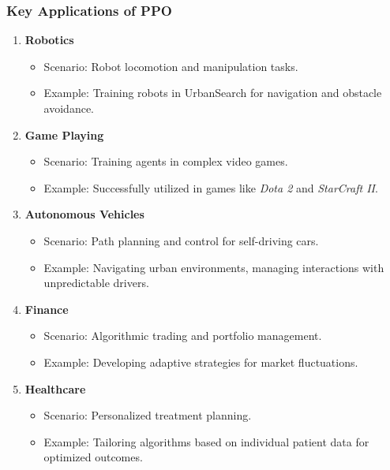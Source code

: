 \documentclass{beamer}
\begin{document}
\begin{frame}[fragile]
    \frametitle{Key Applications of PPO}
    \begin{enumerate}
        \item \textbf{Robotics}
            \begin{itemize}
                \item Scenario: Robot locomotion and manipulation tasks.
                \item Example: Training robots in UrbanSearch for navigation and obstacle avoidance.
            \end{itemize}
        
        \item \textbf{Game Playing}
            \begin{itemize}
                \item Scenario: Training agents in complex video games.
                \item Example: Successfully utilized in games like \textit{Dota 2} and \textit{StarCraft II}.
            \end{itemize}

        \item \textbf{Autonomous Vehicles}
            \begin{itemize}
                \item Scenario: Path planning and control for self-driving cars.
                \item Example: Navigating urban environments, managing interactions with unpredictable drivers.
            \end{itemize}

        \item \textbf{Finance}
            \begin{itemize}
                \item Scenario: Algorithmic trading and portfolio management.
                \item Example: Developing adaptive strategies for market fluctuations.
            \end{itemize}

        \item \textbf{Healthcare}
            \begin{itemize}
                \item Scenario: Personalized treatment planning.
                \item Example: Tailoring algorithms based on individual patient data for optimized outcomes.
            \end{itemize}
    \end{enumerate}
\end{frame}
\end{document}
